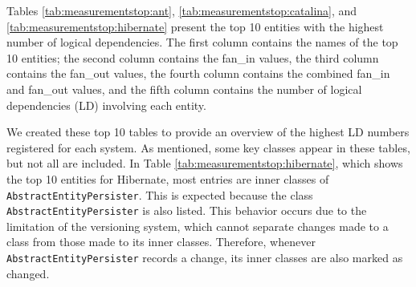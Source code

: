 \begin{table}[!h]
\renewcommand{\arraystretch}{1}
\caption{Measurements for Hibernate key classes.}
\label{tab:measurementsfan:hibernate}
\centering
{}
\end{table}



Tables \ref{tab:measurementstop:ant}, \ref{tab:measurementstop:catalina}, and \ref{tab:measurementstop:hibernate} present the top 10 entities with the highest number of logical dependencies. The first column contains the names of the top 10 entities; the second column contains the fan\_in values, the third column contains the fan\_out values, the fourth column contains the combined fan\_in and fan\_out values, and the fifth column contains the number of logical dependencies (LD) involving each entity.

We created these top 10 tables to provide an overview of the highest LD numbers registered for each system. As mentioned, some key classes appear in these tables, but not all are included. In Table \ref{tab:measurementstop:hibernate}, which shows the top 10 entities for Hibernate, most entries are inner classes of \texttt{AbstractEntityPersister}. This is expected because the class \texttt{AbstractEntityPersister} is also listed. This behavior occurs due to the limitation of the versioning system, which cannot separate changes made to a class from those made to its inner classes. Therefore, whenever \texttt{AbstractEntityPersister} records a change, its inner classes are also marked as changed.

